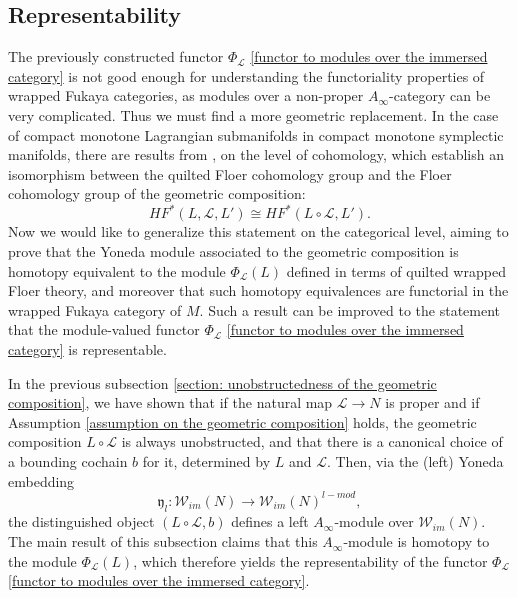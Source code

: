 \documentclass{amsart}
\numberwithin{equation}{section}
\numberwithin{figure}{section}
\begin{document}
\subsection{Representability}
	The previously constructed functor $\Phi_{\mathcal{L}}$ \eqref{functor to modules over the immersed category} is not good enough for understanding the functoriality properties of wrapped Fukaya categories, as modules over a non-proper $A_{\infty}$-category can be very complicated. Thus we must find a more geometric replacement. In the case of compact monotone Lagrangian submanifolds in compact monotone symplectic manifolds, there are results from \cite{Wehrheim-Woodward4}, \cite{Lekili-Lipyanskiy} on the level of cohomology, which establish an isomorphism between the quilted Floer cohomology group and the Floer cohomology group of the geometric composition:
\begin{equation*}
HF^{*}(L, \mathcal{L}, L') \cong HF^{*}(L \circ \mathcal{L}, L').
\end{equation*}
Now we would like to generalize this statement on the categorical level, aiming to prove that the Yoneda module associated to the geometric composition is homotopy equivalent to the module $\Phi_{\mathcal{L}}(L)$ defined in terms of quilted wrapped Floer theory, and moreover that such homotopy equivalences are functorial in the wrapped Fukaya category of $M$. Such a result can be improved to the statement that the module-valued functor $\Phi_{\mathcal{L}}$ \eqref{functor to modules over the immersed category} is representable. \par
	In the previous subsection \ref{section: unobstructedness of the geometric composition}, we have shown that if the natural map $\mathcal{L} \to N$ is proper and if Assumption \ref{assumption on the geometric composition} holds, the geometric composition $L \circ \mathcal{L}$ is always unobstructed, and that there is a canonical choice of a bounding cochain $b$ for it, determined by $L$ and $\mathcal{L}$. Then, via the (left) Yoneda embedding
\begin{equation*}
\mathfrak{y}_{l}: \mathcal{W}_{im}(N) \to \mathcal{W}_{im}(N)^{l-mod},
\end{equation*}
the distinguished object $(L \circ \mathcal{L}, b)$ defines a left $A_{\infty}$-module over $\mathcal{W}_{im}(N)$. The main result of this subsection claims that this $A_{\infty}$-module is homotopy to the module $\Phi_{\mathcal{L}}(L)$, which therefore yields the representability of the functor $\Phi_{\mathcal{L}}$ \eqref{functor to modules over the immersed category}. \par
\end{document}
